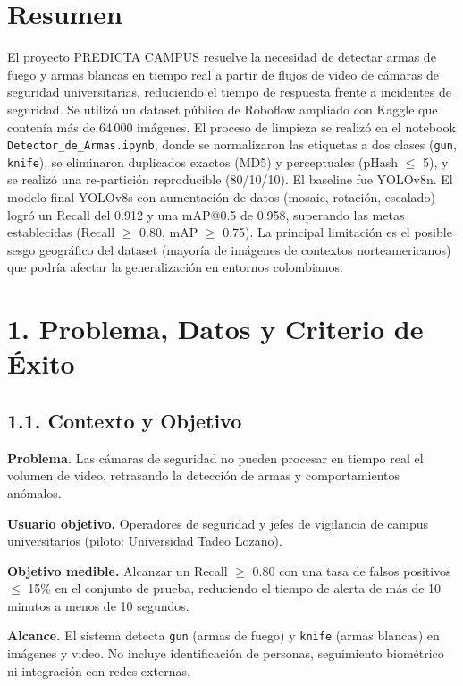 \documentclass[12pt, letterpaper]{article}
\begin{document}
\section{Resumen}

El proyecto PREDICTA CAMPUS resuelve la necesidad de detectar armas de fuego y armas blancas en tiempo real a partir de flujos de video de cámaras de seguridad universitarias, reduciendo el tiempo de respuesta frente a incidentes de seguridad. Se utilizó un dataset público de Roboflow ampliado con Kaggle que contenía más de 64\,000 imágenes. El proceso de limpieza se realizó en el notebook \texttt{Detector\_de\_Armas.ipynb}, donde se normalizaron las etiquetas a dos clases (\texttt{gun}, \texttt{knife}), se eliminaron duplicados exactos (MD5) y perceptuales (pHash $\leq$ 5), y se realizó una re-partición reproducible (80/10/10). El baseline fue YOLOv8n. El modelo final YOLOv8s con aumentación de datos (mosaic, rotación, escalado) logró un Recall del 0.912 y una mAP@0.5 de 0.958, superando las metas establecidas (Recall $\geq$ 0.80, mAP $\geq$ 0.75). La principal limitación es el posible sesgo geográfico del dataset (mayoría de imágenes de contextos norteamericanos) que podría afectar la generalización en entornos colombianos.

\section{1. Problema, Datos y Criterio de Éxito}

\subsection{1.1. Contexto y Objetivo}

\textbf{Problema.} Las cámaras de seguridad no pueden procesar en tiempo real el volumen de video, retrasando la detección de armas y comportamientos anómalos.

\textbf{Usuario objetivo.} Operadores de seguridad y jefes de vigilancia de campus universitarios (piloto: Universidad Tadeo Lozano).

\textbf{Objetivo medible.} Alcanzar un Recall $\geq$ 0.80 con una tasa de falsos positivos $\leq$ 15\% en el conjunto de prueba, reduciendo el tiempo de alerta de más de 10 minutos a menos de 10 segundos.

\textbf{Alcance.} El sistema detecta \texttt{gun} (armas de fuego) y \texttt{knife} (armas blancas) en imágenes y video. No incluye identificación de personas, seguimiento biométrico ni integración con redes externas.
\end{document}
